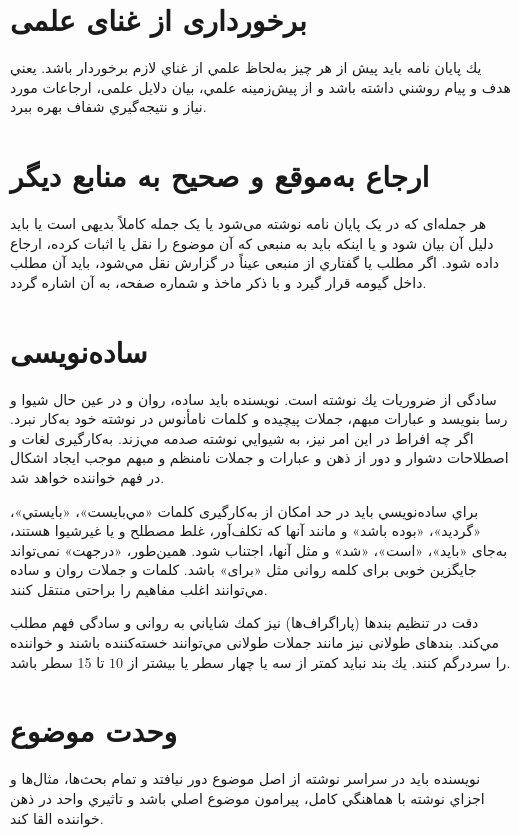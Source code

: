 \section{برخورداری از غنای علمی }

يك پایان نامه بايد پیش از هر چيز به‌لحاظ علمي از غناي لازم برخوردار باشد. يعني هدف و پيام روشني داشته باشد و از پيش‌زمينه علمي، بيان دلايل علمی، ارجاعات مورد نیاز و نتيجه‌گيري شفاف بهره ببرد. 

\section{ارجاع به‌موقع و صحیح به منابع دیگر}
هر جمله‌ای که در یک پایان نامه نوشته می‌شود یا یک جمله کاملاً بدیهی است یا باید دلیل آن بیان شود و یا اینکه باید به منبعی که آن موضوع را نقل یا اثبات کرده، ارجاع داده شود. اگر مطلب يا گفتاري از منبعی عيناً در گزارش نقل مي‌شود، بايد آن مطلب داخل گيومه قرار گيرد و با ذكر ماخذ و شماره صفحه، به آن اشاره گردد.


\section{ساده‌نویسی }
سادگی از ضروريات يك نوشته است. نويسنده بايد ساده، روان و در عين حال شيوا و رسا بنويسد و عبارات مبهم، جملات پيچيده و كلمات نامأنوس در نوشته خود به‌كار نبرد. اگر چه افراط در اين امر نيز، به شيوايي نوشته صدمه مي‌زند. به‌كارگیری لغات و اصطلاحات دشوار و دور از ذهن و عبارات و جملات نامنظم و مبهم موجب ايجاد اشكال در فهم خواننده خواهد شد‌. 

 براي ساده‌نويسي بايد در حد امكان از به‌كارگيری كلمات «مي‌بايست»، «بايستي»، «گرديد»، «بوده باشد» و مانند آنها كه تكلف‌آور، غلط مصطلح و يا غيرشيوا هستند، به‌جای «بايد»، «است»، «شد» و مثل آنها، اجتناب شود‌.‌ همين‌طور، «در‌جهت» نمی‌تواند جايگزين خوبی برای كلمه روانی مثل «برای» باشد‌. ‌كلمات و جملات روان و ساده مي‌توانند اغلب مفاهيم را براحتی منتقل كنند‌.‌
 
دقت در تنظیم بندها (پاراگراف‌ها) نيز كمك شاياني به روانی و سادگی فهم مطلب مي‌كند‌.‌ بندهای طولانی نيز مانند جملات طولانی مي‌توانند خسته‌كننده باشند و خواننده را سردرگم كنند‌.‌ يك بند نبايد کمتر از سه یا چهار سطر یا بيشتر از $10$ تا 15 سطر باشد.‌ 

\section{وحدت موضوع}

نویسنده بايد در سراسر نوشته از اصل موضوع دور نيافتد و تمام بحث‌ها، مثال‌ها و اجزاي نوشته با هماهنگي كامل، پيرامون موضوع اصلي باشد و تاثيري واحد در ذهن خواننده القا كند. 
